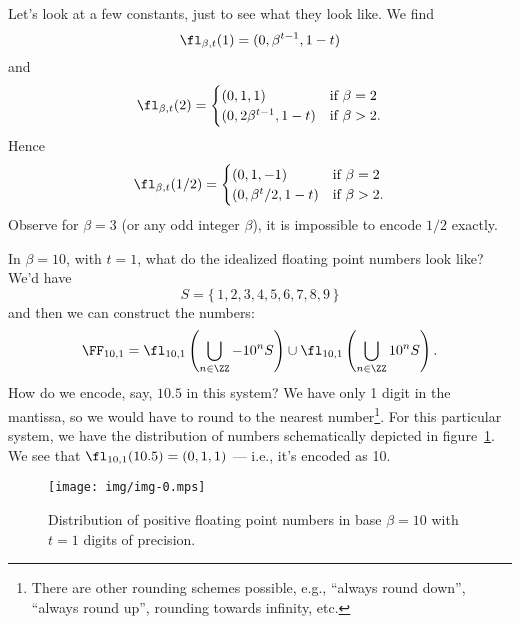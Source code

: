 \begin{ex}
  Let's look at a few constants, just to see what they look like. We find
  \begin{equation}
    \fl_{\beta,t}(1) = (0, \beta^{t-1}, 1-t)
  \end{equation}
  and
  \begin{equation}
    \fl_{\beta,t}(2) = \begin{cases}
      (0, 1, 1) & \mbox{if $\beta=2$}\\
      (0, 2\beta^{t-1}, 1-t)  & \mbox{if $\beta>2$}.
    \end{cases}
  \end{equation}
  Hence
  \begin{equation}
    \fl_{\beta,t}(1/2) = \begin{cases}
      (0, 1, -1) & \mbox{if $\beta=2$}\\
      (0, \beta^{t}/2, 1-t)  & \mbox{if $\beta>2$}.
    \end{cases}
  \end{equation}
  Observe for $\beta=3$ (or any odd integer $\beta$), it is impossible
  to encode $1/2$ exactly.
\end{ex}

\begin{ex}\label{ex:idealized-floating-point:eleven-point-five}
  In $\beta=10$, with $t=1$, what do the idealized floating point numbers
  look like? We'd have
  \begin{equation}
    S = \{\,1,2,3,4,5,6,7,8,9\,\}
  \end{equation}
  and then we can construct the numbers:
  \begin{equation}
    \FF_{10,1} = \fl_{10,1}\left(\bigcup_{n\in\ZZ}-10^{n}S\right)\cup
    \fl_{10,1}\left(\bigcup_{n\in\ZZ}10^{n}S\right).
  \end{equation}
  How do we encode, say, $10.5$ in this system? We have only 1 digit in
  the mantissa, so we would have to round to the nearest
  number\footnote{There are other rounding schemes possible, e.g.,
  ``always round down'', ``always round up'', rounding towards infinity,
  etc.}. For this particular system, we have the distribution of numbers
  schematically depicted in figure~\ref{fig:img-0}. We see that
  $\fl_{10,1}(10.5)=(0,1,1)$ --- i.e., it's encoded as 10.

  \begin{figure}[t]\label{fig:img-0}
    \centering
    \texttt{[image: img/img-0.mps]}
    \caption{Distribution of positive floating point numbers in base
      $\beta=10$ with $t=1$ digits of precision.}
  \end{figure}
\end{ex}

